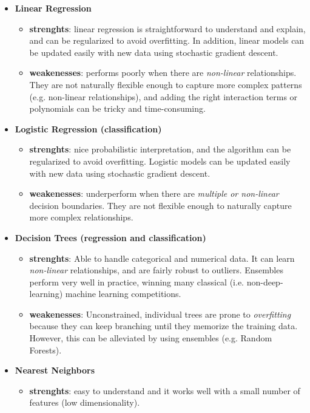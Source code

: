 \documentclass[11pt]{article}
\begin{document}
\begin{itemize}
	\item \textbf{Linear Regression}
	\begin{itemize}
		\item \textbf{strenghts}: linear regression is straightforward to understand and explain, and can be regularized to avoid overfitting. In addition, linear models can be updated easily with new data using stochastic gradient descent.
		\item \textbf{weakenesses}: performs poorly when there are \textit{non-linear} relationships. They are not naturally flexible enough to capture more complex patterns (e.g. non-linear relationships), and adding the right interaction terms or polynomials can be tricky and time-consuming.
	\end{itemize}
	\item \textbf{Logistic Regression (classification)}
	\begin{itemize}
		\item \textbf{strenghts}:  nice probabilistic interpretation, and the algorithm can be regularized to avoid overfitting. Logistic models can be updated easily with new data using stochastic gradient descent.
		\item \textbf{weakenesses}: underperform when there are \textit{multiple or non-linear} decision boundaries. They are not flexible enough to naturally capture more complex relationships.
	\end{itemize}
	\item \textbf{Decision Trees (regression and classification)}
	\begin{itemize}
		\item \textbf{strenghts}: Able to handle categorical and numerical data. It can learn \textit{non-linear} relationships, and are fairly robust to outliers. Ensembles perform very well in practice, winning many classical (i.e. non-deep-learning) machine learning competitions. 
		\item \textbf{weakenesses}: Unconstrained, individual trees are prone to \textit{overfitting} because they can keep branching until they memorize the training data. However, this can be alleviated by using ensembles (e.g. Random Forests).
	\end{itemize}
	\item \textbf{Nearest Neighbors}
	\begin{itemize}
		\item \textbf{strenghts}: easy to understand and it works well with a small number of features (low dimensionality).

\end{itemize}
\end{itemize}
\end{document}
